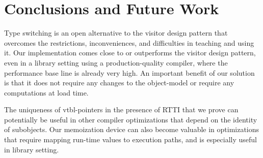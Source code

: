 \section{Conclusions and Future Work} %
\label{sec:cc}

Type switching is an open alternative to the visitor design pattern that overcomes 
the restrictions, inconveniences, and difficulties in teaching and using 
it. Our implementation comes close to or 
outperforms the visitor design pattern, even in a library setting 
using a production-quality compiler, where the performance base line is 
already very high. An important benefit of our solution is that it does not 
require any changes to the \Cpp{} object-model or require any computations at load 
time.

The uniqueness of vtbl-pointers in the presence of RTTI that we prove can 
potentially be useful in other compiler optimizations that depend on the 
identity of subobjects. Our memoization device can also become valuable in 
optimizations that require mapping run-time values to execution paths, 
and is especially useful in library setting.

%
%
%
%
%
